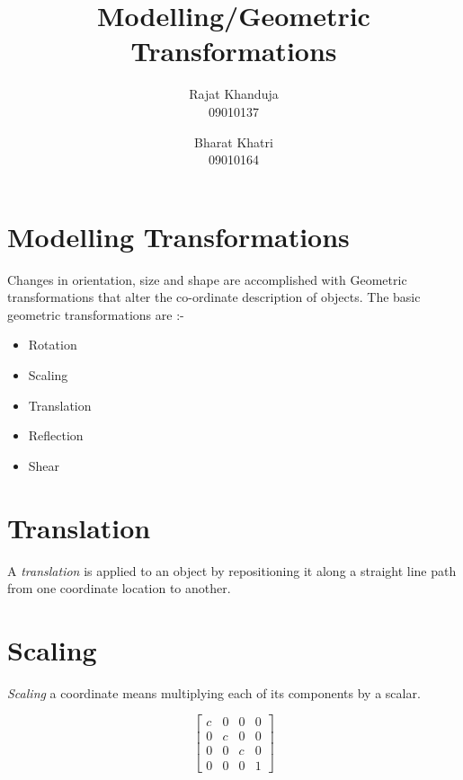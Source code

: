 \documentclass[a4paper,12pt,titlepage]{article}
\begin{document}
\title{Modelling/Geometric Transformations}

\author{Rajat Khanduja \\
	09010137 \\
	\and
	Bharat Khatri\\
	09010164}
\date{} %

\maketitle

\tableofcontents
\pagebreak

\section{Modelling Transformations}
Changes in orientation, size and shape are accomplished with Geometric transformations that alter the co-ordinate description of objects. The basic geometric transformations are :- \\
\begin{itemize}
\item Rotation
\item Scaling
\item Translation
\item Reflection
\item Shear
\end{itemize}

\pagebreak
\section{Translation}
A \emph{translation} is applied to an object by repositioning it along a straight line path from one coordinate location to another.

\pagebreak
\section{Scaling}
\emph{Scaling} a coordinate means multiplying each of its components by a scalar. 


\begin {equation*}
	\begin{bmatrix}
		c & 0 & 0 & 0 \\
		0 & c & 0 & 0 \\
		0 & 0 & c & 0 \\
		0 & 0 & 0 & 1
	\end{bmatrix}
\end{equation*}
\end{document}
